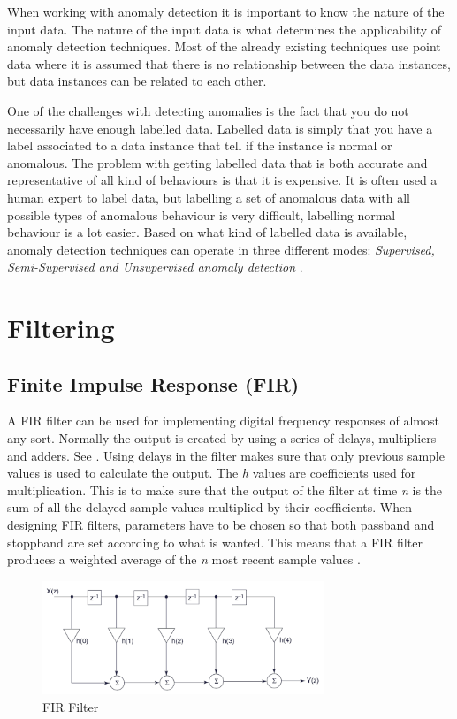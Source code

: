\documentclass[english, a4paper]{report}
\begin{document}
{{        When working with anomaly detection it is important to know the nature of the input data. The nature of the input data is what determines the applicability of anomaly detection techniques. Most of the already existing techniques use point data where it is assumed that there is no relationship between the data instances, but data instances can be related to each other.
        \par
        One of the challenges with detecting anomalies is the fact that you do not necessarily have enough labelled data. Labelled data is simply that you have a label associated to a data instance that tell if the instance is normal or anomalous. The problem with getting labelled data that is both accurate and representative of all kind of behaviours is that it is expensive. It is often used a human expert to label data, but labelling a set of anomalous data with all possible types of anomalous behaviour is very difficult, labelling normal behaviour is a lot easier. Based on what kind of labelled data is available, anomaly detection techniques can operate in three different modes: \textit{Supervised, Semi-Supervised and Unsupervised anomaly detection} \cite{anomalyDetection}.
    }
    
    \section{Filtering}\label{filtering}
    {
        \subsection{Finite Impulse Response (FIR)}\label{fir}
        {
            A FIR filter can be used for implementing digital frequency responses of almost any sort. Normally the output is created by using a series of delays, multipliers and adders. See . Using delays in the filter makes sure that only previous sample values is used to calculate the output. The \textit{h} values are coefficients used for multiplication. This is to make sure that the output of the filter at time \textit{n} is the sum of all the delayed sample values multiplied by their coefficients. When designing FIR filters, parameters have to be chosen so that both passband and stoppband are set according to what is wanted. This means that a FIR filter produces a weighted average of the \textit{n} most recent sample values \cite{firfilter}. 
            
            \begin{figure}[H]
                \centering
                \includegraphics[width=0.75\textwidth]{FIRFilter}
                \caption{FIR Filter \cite{firFilterFig}}
                \label{fig:FIRfilter}
            \end{figure}
            
}}}
\end{document}
